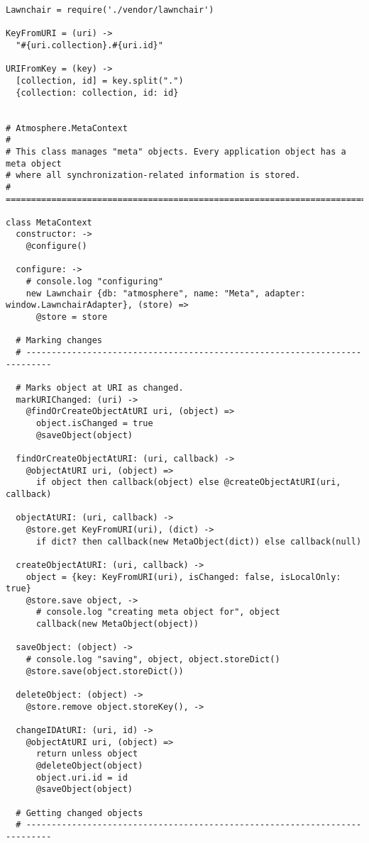 \begin{lstlisting}[caption=meta_context.coffee]
Lawnchair = require('./vendor/lawnchair')

KeyFromURI = (uri) ->
  "#{uri.collection}.#{uri.id}"

URIFromKey = (key) ->
  [collection, id] = key.split(".")
  {collection: collection, id: id}
  

# Atmosphere.MetaContext
#
# This class manages "meta" objects. Every application object has a meta object
# where all synchronization-related information is stored.
# =============================================================================

class MetaContext
  constructor: ->
    @configure()
    
  configure: ->
    # console.log "configuring"
    new Lawnchair {db: "atmosphere", name: "Meta", adapter: window.LawnchairAdapter}, (store) =>
      @store = store
  
  # Marking changes
  # ---------------------------------------------------------------------------
  
  # Marks object at URI as changed.
  markURIChanged: (uri) ->
    @findOrCreateObjectAtURI uri, (object) =>
      object.isChanged = true
      @saveObject(object)

  findOrCreateObjectAtURI: (uri, callback) ->
    @objectAtURI uri, (object) =>
      if object then callback(object) else @createObjectAtURI(uri, callback)
        
  objectAtURI: (uri, callback) ->
    @store.get KeyFromURI(uri), (dict) ->
      if dict? then callback(new MetaObject(dict)) else callback(null)
  
  createObjectAtURI: (uri, callback) ->
    object = {key: KeyFromURI(uri), isChanged: false, isLocalOnly: true}
    @store.save object, ->
      # console.log "creating meta object for", object
      callback(new MetaObject(object))
  
  saveObject: (object) ->
    # console.log "saving", object, object.storeDict()
    @store.save(object.storeDict())
  
  deleteObject: (object) ->
    @store.remove object.storeKey(), ->
  
  changeIDAtURI: (uri, id) ->
    @objectAtURI uri, (object) =>
      return unless object
      @deleteObject(object)
      object.uri.id = id
      @saveObject(object)
  
  # Getting changed objects
  # ---------------------------------------------------------------------------
  

\end{lstlisting}

